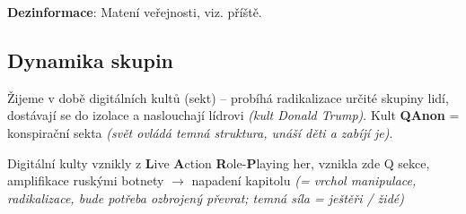 \vspace{6pt}
\noindent \textbf{Dezinformace}: Matení veřejnosti, viz. příště.

\subsection{Dynamika skupin}

Žijeme v době digitálních kultů (sekt) -- probíhá radikalizace určité skupiny lidí, dostávají se do izolace a naslouchají lídrovi \textit{(kult Donald Trump)}. Kult \textbf{QAnon} = konspirační sekta \textit{(svět ovládá temná struktura, unáší děti a zabíjí je)}.

\vspace{4pt}
\noindent Digitální kulty vznikly z \textbf{L}ive \textbf{A}ction \textbf{R}ole-\textbf{P}laying her, vznikla zde Q sekce, amplifikace ruskými botnety $\to$ napadení kapitolu \textit{(= vrchol manipulace, radikalizace, bude potřeba ozbrojený převrat; temná síla = ještěři / židé)}
